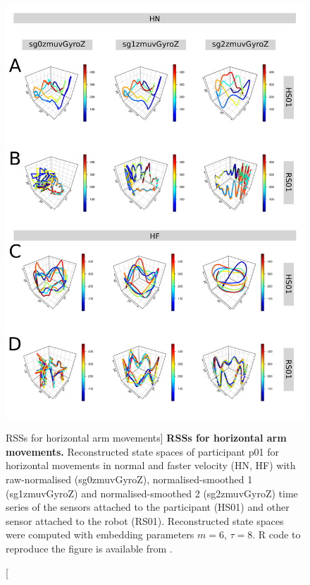 \begin{figure}
\centering
\includegraphics[height=0.85\textheight]{rss_aH}
\caption
	[RSSs for horizontal arm movements]{
	{\bf RSSs for horizontal arm movements.}
	Reconstructed state spaces %
	of participant p01 for horizontal movements in normal and faster 
	velocity (HN, HF) with raw-normalised (sg0zmuvGyroZ), 
	normalised-smoothed 1 (sg1zmuvGyroZ) and 
	normalised-smoothed 2 (sg2zmuvGyroZ) time series of the 
	sensors attached to the participant (HS01) and other sensor 
	attached to the robot (RS01).	
	Reconstructed state spaces were computed with 
	embedding parameters $m=6$, $\tau=8$.
	R code to reproduce the figure is available from \cite{hwum2018}.
        }
    \label{fig:rss_aHw10}
\end{figure}



